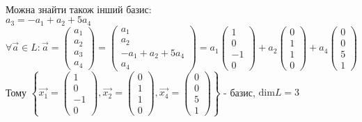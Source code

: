 \documentclass[a4paper, 14pt]{extarticle}
\def\bigline{\vspace{5mm}\\}
\def\dim#1{\textrm{dim} {#1}}
\begin{document}
	\bigline
	Можна знайти також інший базис:\\
	$a_3 = -a_1 + a_2 + 5a_4$\\
	$\forall \vec{a} \in L: \vec{a} = \begin{pmatrix} a_1 \\ a_2 \\ a_3 \\ a_4 \end{pmatrix} = \begin{pmatrix} a_1 \\ a_2 \\ -a_1 + a_2 + 5a_4 \\ a_4 \end{pmatrix} = a_1 \begin{pmatrix} 1 \\ 0 \\ -1 \\ 0 \end{pmatrix} + a_2 \begin{pmatrix} 0 \\ 1 \\ 1 \\ 0 \end{pmatrix} + a_4 \begin{pmatrix} 0 \\ 0 \\ 5 \\ 1 \end{pmatrix}$\\
	Тому $\left\{\vec{x_1} = \begin{pmatrix} 1 \\ 0 \\ -1 \\ 0\end{pmatrix}, \vec{x_2} = \begin{pmatrix} 0 \\ 1 \\ 1 \\ 0\end{pmatrix}, \vec{x_4} = \begin{pmatrix} 0 \\ 0 \\ 5 \\ 1\end{pmatrix} \right\}$ - базис, $\dim{L} = 3$
	\bigline
	
\end{document}
